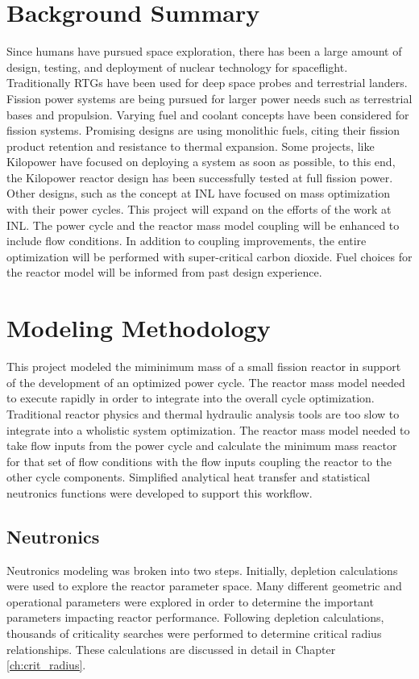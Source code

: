 \section{Background Summary}
Since humans have pursued space exploration, there has been a large amount of design, 
testing, and deployment of nuclear technology for spaceflight. Traditionally
RTGs have been used for deep space probes and terrestrial landers. Fission power
systems are being pursued for larger power needs such as terrestrial bases and
propulsion. Varying fuel and coolant concepts have been considered for fission
systems. Promising designs are using monolithic fuels, citing their fission
product retention and resistance to thermal expansion. Some projects, like
Kilopower have focused on deploying a system as soon as possible, to this end,
the Kilopower reactor design has been successfully tested at full fission power.
Other designs, such as the concept at INL have focused on mass optimization with
their power cycles. This project will expand on the efforts of the work at INL.
The power cycle and the reactor mass model coupling will be enhanced to include
flow conditions. In addition to coupling improvements, the entire optimization
will be performed with super-critical carbon dioxide. Fuel choices for the
reactor model will be informed from past design experience.

\section{Modeling Methodology}
This project modeled the miminimum mass of a small fission reactor in support of
the development of an optimized power cycle. The reactor mass model needed to
execute rapidly in order to integrate into the overall cycle optimization.
Traditional reactor physics and thermal hydraulic analysis tools are too slow to
integrate into a wholistic system optimization. The reactor mass model needed to
take flow inputs from the power cycle and calculate the minimum mass reactor for
that set of flow conditions with the flow inputs coupling the reactor to 
the other cycle components. Simplified analytical heat transfer and
statistical neutronics functions were developed to support this workflow.

\subsection{Neutronics}
Neutronics modeling was broken into two steps. Initially, depletion calculations
were used to explore the reactor parameter space. Many different geometric and
operational parameters were explored in order to determine the important
parameters impacting reactor performance. Following depletion calculations,
thousands of criticality searches were performed to determine critical radius
relationships. These calculations are discussed in detail in Chapter
\ref{ch:crit_radius}.

